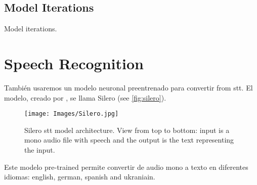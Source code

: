 \subsection{Model Iterations}\label{sec:model-iterations}

Model iterations.



\section{Speech Recognition}%
\label{sec:speech}

También usaremos un modelo neuronal preentrenado para convertir from
\gls{stt}. El modelo, creado por
, se llama Silero (see
\vref{fig:silero}).

\begin{figure}[p]
  \centering
  \texttt{[image: Images/Silero.jpg]}
  \caption[Silero \gls*{stt} model architecture]{Silero \gls{stt} model
    architecture. View from top to bottom: input is a mono audio file with
    speech and the output is the text representing the
    input.}\label{fig:silero}
\end{figure}

Este modelo pre-trained permite convertir de audio mono a texto en diferentes
idiomas: english, german, spanish and ukraniain.
